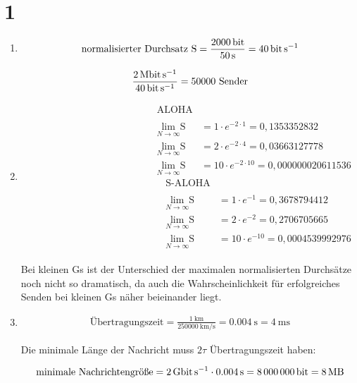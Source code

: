 \documentclass[ngerman]{scrartcl}
\begin{document}
\section*{1}

\begin{enumerate}[label=\alph*)]
  \item
  \begin{align*}
    \text{normalisierter Durchsatz S} &= \frac{\SI{2000}{\bit}}{\SI{50}{\s}} = \SI{40}{\bit\per\s}\\
  \end{align*}

  \begin{align*}
    \frac{\SI{2}{\mega\bit\per\s}}{\SI{40}{\bit\per\s}} = 50000\ \text{Sender}
  \end{align*}

  \item
  \begin{align*}
    \begin{split}
      \text{ALOHA}\\
      \\
      \lim_{N \to \infty} \text{S} &= 1 \cdot e^{-2 \cdot 1} = 0,1353352832\\
      \lim_{N \to \infty} \text{S} &= 2 \cdot e^{-2 \cdot 4} = 0,03663127778\\
      \lim_{N \to \infty} \text{S} &= 10 \cdot e^{-2 \cdot 10} = 0,000000020611536
    \end{split}
    \begin{split}
      \text{S-ALOHA}\\
      \\
      \lim_{N \to \infty} \text{S} &= 1 \cdot e^{-1} = 0,3678794412\\
      \lim_{N \to \infty} \text{S} &= 2 \cdot e^{-2} = 0,2706705665\\
      \lim_{N \to \infty} \text{S} &= 10 \cdot e^{-10} = 0,0004539992976
    \end{split}
  \end{align*}

  Bei kleinen Gs ist der Unterschied der maximalen normalisierten Durchsätze noch nicht so dramatisch,
  da auch die Wahrscheinlichkeit für erfolgreiches Senden bei kleinen Gs näher beieinander liegt.

  \item
  \begin{align*}
    \text{Übertragungszeit} = \frac{\SI{1}{\km}}{\SI{250000}{\km\per\s}} = \SI{0,004}{\s} = \SI{4}{\ms}
  \end{align*}

  Die minimale Länge der Nachricht muss $2\tau$ Übertragungszeit haben:

  \begin{align*}
    \text{minimale Nachrichtengröße} = \SI{2}{\giga\bit\per\s} \cdot \SI{0,004}{\s} = \SI{8000000}{\bit} = \SI{8}{\mega\byte}
  \end{align*}
\end{enumerate}
\end{document}
